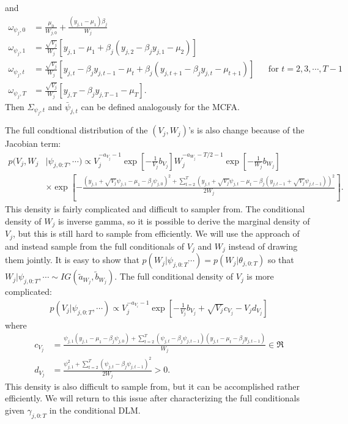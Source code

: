 \documentclass[graybox]{svmult}
\begin{document}
and
\begin{align*}
\omega_{\psi_j,0}&=\frac{\mu_0}{W_{j,0}} + \frac{(y_{j,1} - \mu_1)\beta_j}{W_j}&&\\
\omega_{\psi_j,1}&=\frac{\sqrt{V_j}}{W_j}\left[y_{j,1} - \mu_1 + \beta_j(y_{j,2} - \beta_jy_{j,1} - \mu_2)\right]&&\\
\omega_{\psi_j,t}&=\frac{\sqrt{V_j}}{W_j}\left[y_{j,t} - \beta_jy_{j,t-1} - \mu_t + \beta_j(y_{j,t+1} - \beta_jy_{j,t} - \mu_{t+1})\right]&&\mbox{for } t=2,3,\cdots,T-1\\
\omega_{\psi_j,T}&=\frac{\sqrt{V_j}}{W_j}\left[y_{j,T} - \beta_jy_{j,T-1} - \mu_T\right].&&
\end{align*}
Then $\Sigma_{\psi_j,t}$ and $\bar{\psi}_{j,t}$ can be defined analogously for the MCFA.

The full condtional distribution of the $(V_j,W_j)$'s is also change because of the Jacobian term:
\begin{align*}
p(V_j,W_j&|\psi_{j,0:T},\cdots) \propto V_j^{-a_{V_j}-1}\exp\left[-\frac{1}{V_j}b_{V_j}\right]W_j^{-a_{W_j}-T/2-1}\exp\left[-\frac{1}{W_j}b_{W_j}\right]\\
&\times\exp\left[-\frac{(y_{j,1} + \sqrt{V_j}\psi_{j,1} - \mu_1 - \beta_j\psi_{j,0})^2 +  \sum_{t=2}^T(y_{j,t} + \sqrt{V_j}\psi_{j,t}-\mu_t-\beta_j(y_{j,t-1} + \sqrt{V_j}\psi_{j,t-1}))^2}{2W_j}\right].
\end{align*}
This density is fairly complicated and difficult to sampler from. The conditional density of $W_j$ is inverse gamma, so it is possible to derive the marginal density of $V_j$, but this is still hard to sample from efficiently. We will use the approach of \citet{simpson2014interweaving} and instead sample from the full conditionals of $V_j$ and $W_j$ instead of drawing them jointly. It is easy to show that $p(W_j|\psi_{j,0:T}\cdots)=p(W_j|\theta_{j,0:T})$ so that $W_j|\psi_{j,0:T},\cdots \sim IG(\tilde{a}_{W_j},\tilde{b}_{W_j})$. The full conditional density of $V_j$ is more complicated:
\begin{align*}
p(V_j|\psi_{j,0:T},\cdots) \propto V_j^{-a_{V_i}-1}\exp\left[-\frac{1}{V_j}b_{V_j} + \sqrt{V_j}c_{V_j} - V_jd_{V_j}\right]
\end{align*}
where
\begin{align*}
c_{V_j}&=\frac{\psi_{j,1}(y_{j,1} - \mu_1 - \beta_j\psi_{j,0}) + \sum_{t=2}^T(\psi_{j,t} - \beta_j\psi_{j,t-1})(y_{j,t} - \mu_t - \beta_jy_{j,t-1})}{W_j} \in \Re\\
d_{V_j}&=\frac{\psi_{j,1}^2 + \sum_{t=2}^T(\psi_{j,t} - \beta_j\psi_{j,t-1})^2}{2W_j} > 0.
\end{align*}
This density is also difficult to sample from, but it can be accomplished rather efficiently. We will return to this issue after characterizing the full conditionals given $\gamma_{j,0:T}$ in the conditional DLM.
\end{document}
